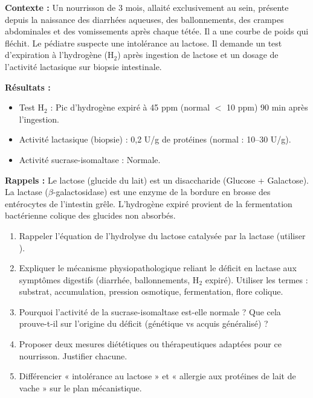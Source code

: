 \documentclass[11pt]{article}
\begin{document}
\begin{exercice}
\textbf{Contexte :} Un nourrisson de 3 mois, allaité exclusivement au sein, présente depuis la naissance des diarrhées aqueuses, des ballonnements, des crampes abdominales et des vomissements après chaque tétée. Il a une courbe de poids qui fléchit. Le pédiatre suspecte une intolérance au lactose. Il demande un test d'expiration à l'hydrogène (H$_2$) après ingestion de lactose et un dosage de l'activité lactasique sur biopsie intestinale.

\textbf{Résultats :}
\begin{itemize}
    \item Test H$_2$ : Pic d'hydrogène expiré à 45 ppm (normal $<$ 10 ppm) 90 min après l'ingestion.
    \item Activité lactasique (biopsie) : 0,2 U/g de protéines (normal : 10--30 U/g).
    \item Activité sucrase-isomaltase : Normale.
\end{itemize}

\textbf{Rappels :} Le lactose (glucide du lait) est un disaccharide (Glucose + Galactose). La lactase ($\beta$-galactosidase) est une enzyme de la bordure en brosse des entérocytes de l'intestin grêle. L'hydrogène expiré provient de la fermentation bactérienne colique des glucides non absorbés.

\begin{enumerate}
    \item Rappeler l'équation de l'hydrolyse du lactose catalysée par la lactase (utiliser \ce{->}).
    \item Expliquer le mécanisme physiopathologique reliant le déficit en lactase aux symptômes digestifs (diarrhée, ballonnements, H$_2$ expiré). Utiliser les termes : substrat, accumulation, pression osmotique, fermentation, flore colique.
    \item Pourquoi l'activité de la sucrase-isomaltase est-elle normale ? Que cela prouve-t-il sur l'origine du déficit (génétique vs acquis généralisé) ?
    \item Proposer deux mesures diététiques ou thérapeutiques adaptées pour ce nourrisson. Justifier chacune.
    \item Différencier « intolérance au lactose » et « allergie aux protéines de lait de vache » sur le plan mécanistique.
\end{enumerate}
\end{exercice}
\end{document}
